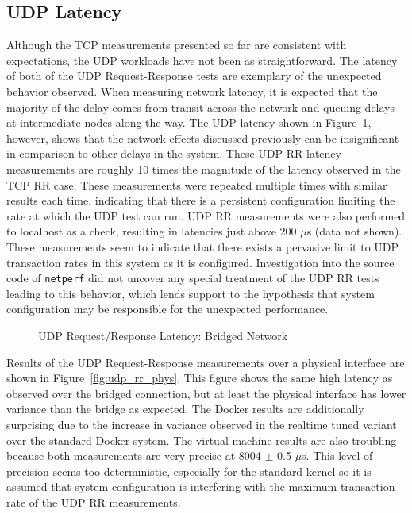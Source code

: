 \subsection{UDP Latency} %
\label{sub:udplatency}

Although the TCP measurements presented so far are consistent with expectations, the UDP workloads have not been as straightforward.
The latency of both of the UDP Request-Response tests are exemplary of the unexpected behavior observed.
When measuring network latency, it is expected that the majority of the delay comes from transit across the network and queuing delays at intermediate nodes along the way.  
The UDP latency shown in Figure~\ref{fig:udp_rr_bridge}, however, shows that the network effects discussed previously can be insignificant in comparison to other delays in the system.
These UDP RR latency measurements are roughly 10 times the magnitude of the latency observed in the TCP RR case.
These measurements were repeated multiple times with similar results each time, indicating that there is a persistent configuration limiting the rate at which the UDP test can run.
UDP RR measurements were also performed to localhost as a check, resulting in latencies just above 200 $\mu$s (data not shown).  
These measurements seem to indicate that there exists a pervasive limit to UDP transaction rates in this system as it is configured.  
Investigation into the source code of \texttt{netperf} did not uncover any special treatment of the UDP RR tests leading to this behavior, which lends support to the hypothesis that system configuration may be responsible for the unexpected performance.

\begin{figure}
    \centering
    \def\svgwidth{\columnwidth}
    
    \caption{UDP Request/Response Latency: Bridged Network}
    \label{fig:udp_rr_bridge}
\end{figure}

Results of the UDP Request-Response measurements over a physical interface are shown in Figure~\ref{fig:udp_rr_phys}.  
This figure shows the same high latency as observed over the bridged connection, but at least the physical interface has lower variance than the bridge as expected.
The Docker results are additionally surprising due to the increase in variance observed in the realtime tuned variant over the standard Docker system.
The virtual machine results are also troubling because both measurements are very precise at 8004 $\pm$ 0.5 $\mu$s.  
This level of precision seems too deterministic, especially for the standard kernel so it is assumed that system configuration is interfering with the maximum transaction rate of the UDP RR measurements.

